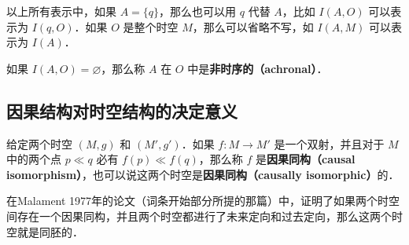 以上所有表示中，如果 $A=\{q\}$，那么也可以用 $q$ 代替 $A$，比如 $I(A, O)$ 可以表示为 $I(q, O)$．如果 $O$ 是整个时空 $M$，那么可以省略不写，如 $I(A, M)$ 可以表示为 $I(A)$．

如果 $I(A, O)=\varnothing$，那么称 $A$ 在 $O$ 中是\textbf{非时序的（achronal）}．

\subsection{因果结构对时空结构的决定意义}

给定两个时空 $(M, g)$ 和 $(M', g')$．如果 $f:M\rightarrow M'$ 是一个双射，并且对于 $M$ 中的两个点 $p\ll q$ 必有 $f(p)\ll f(q)$，那么称 $f$ 是\textbf{因果同构（causal isomorphism）}，也可以说这两个时空是\textbf{因果同构（causally isomorphic）}的．

在Malament 1977年的论文（词条开始部分所提的那篇）中，证明了如果两个时空间存在一个因果同构，并且两个时空都进行了未来定向和过去定向，那么这两个时空就是同胚的．







